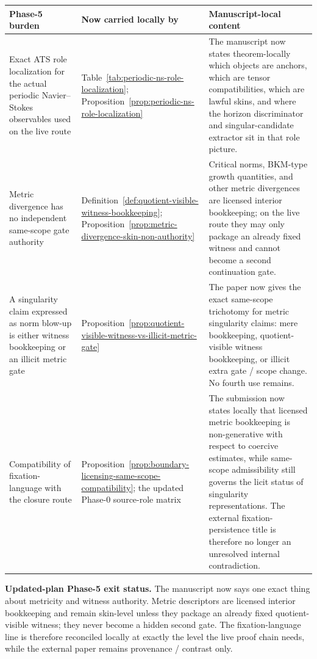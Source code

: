 \begin{center}
\footnotesize
\renewcommand{\arraystretch}{1.16}
\setlength{\tabcolsep}{4pt}
\begin{tabularx}{0.98\textwidth}{@{}L{0.31\textwidth}L{0.24\textwidth}Y@{}}
\toprule
\textbf{Phase-5 burden} & \textbf{Now carried locally by} & \textbf{Manuscript-local content}\\
\midrule
Exact ATS role localization for the actual periodic Navier--Stokes observables used on the live route & Table~\ref{tab:periodic-ns-role-localization}; Proposition~\ref{prop:periodic-ns-role-localization} & The manuscript now states theorem-locally which objects are anchors, which are tensor compatibilities, which are lawful skins, and where the horizon discriminator and singular-candidate extractor sit in that role picture.\\
Metric divergence has no independent same-scope gate authority & Definition~\ref{def:quotient-visible-witness-bookkeeping}; Proposition~\ref{prop:metric-divergence-skin-non-authority} & Critical norms, BKM-type growth quantities, and other metric divergences are licensed interior bookkeeping; on the live route they may only package an already fixed witness and cannot become a second continuation gate.\\
A singularity claim expressed as norm blow-up is either witness bookkeeping or an illicit metric gate & Proposition~\ref{prop:quotient-visible-witness-vs-illicit-metric-gate} & The paper now gives the exact same-scope trichotomy for metric singularity claims: mere bookkeeping, quotient-visible witness bookkeeping, or illicit extra gate / scope change. No fourth use remains.\\
Compatibility of fixation-language with the closure route & Proposition~\ref{prop:boundary-licensing-same-scope-compatibility}; the updated Phase-0 source-role matrix & The submission now states locally that licensed metric bookkeeping is non-generative with respect to coercive estimates, while same-scope admissibility still governs the licit status of singularity representations. The external fixation-persistence title is therefore no longer an unresolved internal contradiction.\\
\bottomrule
\end{tabularx}
\end{center}

\noindent\textbf{Updated-plan Phase-5 exit status.} The manuscript now says one exact thing about metricity and witness authority. Metric descriptors are licensed interior bookkeeping and remain skin-level unless they package an already fixed quotient-visible witness; they never become a hidden second gate. The fixation-language line is therefore reconciled locally at exactly the level the live proof chain needs, while the external paper remains provenance / contrast only.

